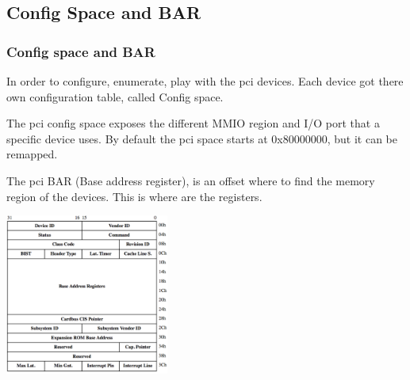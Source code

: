\subsection{Config Space and BAR}
\begin{frame}
\frametitle{Config space and BAR}
In order to configure, enumerate, play with the pci devices. Each device got
there own configuration table, called Config space.

\-

The pci config space exposes the different MMIO region and I/O port that a specific device uses. By default the pci space starts at 0x80000000, but it can be remapped.

\-

The pci BAR (Base address register), is an offset where to find the memory region of the devices. This is where are the registers.

\end{frame}

\begin{frame}
\begin{center}
\includegraphics[height=150pt]{figures/config_space}
\end{center}
\end{frame}

